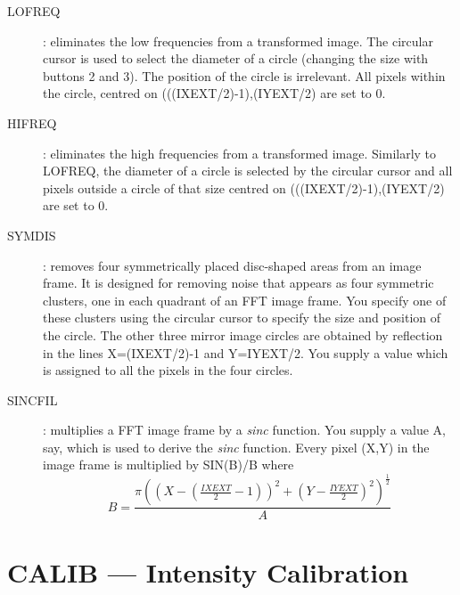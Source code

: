 \begin{enumerate}
\begin{description}
\item [LOFREQ]:
eliminates the low frequencies from a transformed image.
The circular cursor is used to select the diameter of a circle (changing the
size with buttons 2 and 3).
The position of the circle is irrelevant.
All pixels within the circle, centred on (((IXEXT/2)-1),(IYEXT/2) are set to 0.
\item [HIFREQ]:
eliminates the high frequencies from a transformed image.
Similarly to LOFREQ, the diameter of a circle is selected by the circular cursor
and all pixels outside a circle of that size centred on (((IXEXT/2)-1),(IYEXT/2)
are set to 0.
\item [SYMDIS]:
removes four symmetrically placed disc-shaped areas from an image frame.
It is designed for removing noise that appears as four symmetric clusters, one
in each quadrant of an FFT image frame.
You specify one of these clusters using the circular cursor to specify the size
and position of the circle.
The other three mirror image circles are obtained by reflection in the lines
X=(IXEXT/2)-1 and Y=IYEXT/2.
You supply a value which is assigned to all the pixels in the four circles.
\item [SINCFIL]:
multiplies a FFT image frame by a {\em sinc} function.
You supply a value A, say, which is used to derive the {\em sinc} function.
Every pixel (X,Y) in the image frame is multiplied by SIN(B)/B where
\begin{displaymath}
B=\frac {\pi( (X-(\frac{IXEXT}{2}-1))^{2} +
(Y-\frac{IYEXT}{2})^{2} )^{\frac{1}{2}}} {A}
\end{displaymath}
\end{description}
\end{enumerate}

\section {CALIB --- Intensity Calibration}

